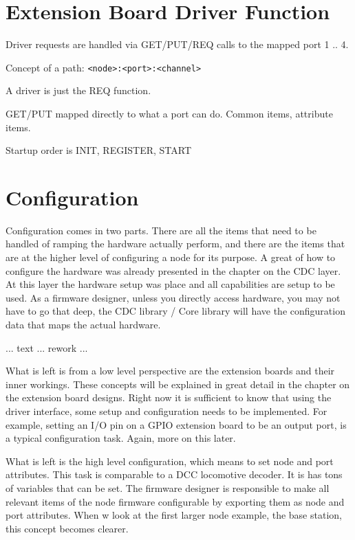 \section{Extension Board Driver Function}

Driver requests are handled via GET/PUT/REQ calls to the mapped port 1 .. 4.

Concept of a path: \texttt{<node>:<port>:<channel>}

A driver is just the REQ function. 

GET/PUT mapped directly to what a port can do. Common items, attribute items. 

Startup order is INIT, REGISTER, START 



\section{Configuration}

Configuration comes in two parts. There are all the items that need to be handled of ramping the hardware actually perform, and there are the items that are at the higher level of configuring a node for its purpose. A great of how to configure the hardware was already presented in the chapter on the CDC layer. At this layer the hardware setup was place and all capabilities are setup to be used. As a firmware designer, unless you directly access hardware, you may not have to go that deep, the CDC library / Core library will have the configuration data that maps the actual hardware. 

... text ... rework ...

What is left is from a low level perspective are the extension boards and their inner workings. These concepts will be explained in great detail in the chapter on the extension board designs. Right now it is sufficient to know that using the driver interface, some setup and configuration needs to be implemented. For example, setting an I/O pin on a GPIO extension board to be an output port, is a typical configuration task. Again, more on this later.

What is left is the high level configuration, which means to set node and port attributes. This task is comparable to a DCC locomotive decoder. It is has tons of variables  that can be set. The firmware designer is responsible to make all relevant items of the node firmware configurable by exporting them as node and port attributes. When w look at the first larger node example, the base station, this concept becomes clearer.

